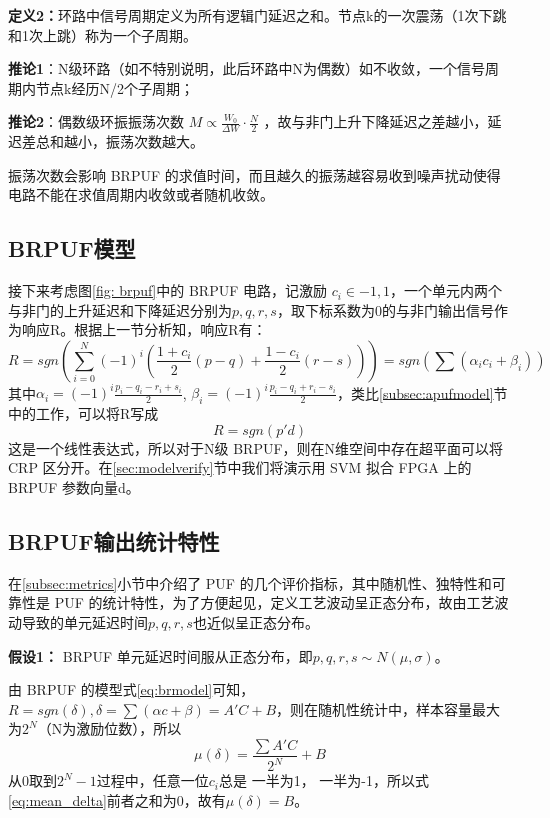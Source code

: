 \textbf{定义2：}环路中信号周期定义为所有逻辑门延迟之和。节点k的一次震荡（1次下跳和1次上跳）称为一个子周期。

\textbf{推论1}：N级环路（如不特别说明，此后环路中N为偶数）如不收敛，一个信号周期内节点k经历N/2个子周期；

\textbf{推论2}：偶数级环振振荡次数 $ M \propto \frac{W_0}{\Delta W}\cdot\frac{N}{2} $ ，故与非门上升下降延迟之差越小，延迟差总和越小，振荡次数越大。

振荡次数会影响 BRPUF 的求值时间，而且越久的振荡越容易收到噪声扰动使得电路不能在求值周期内收敛或者随机收敛。

\subsection{BRPUF模型}\label{subsec:brpufmodel}
接下来考虑图\ref{fig: brpuf}中的 BRPUF 电路，记激励 $ c_i\in{-1,1} $，一个单元内两个与非门的上升延迟和下降延迟分别为$ p,q,r,s $，取下标系数为0的与非门输出信号作为响应R。根据上一节分析知，响应R有：
\begin{equation}\label{eq:brmodel}
R=sgn(\sum\limits_{i=0}^{N}(-1)^i(\frac{1+c_i}{2}(p-q)+\frac{1-c_i}{2}(r-s)))=sgn(\sum(\alpha_i c_i+\beta_i))
\end{equation}
其中$ \alpha_i=(-1)^i\frac{p_i-q_i-r_i+s_i}{2} $, $ \beta_i=(-1)^i\frac{p_i-q_i+r_i-s_i}{2} $，类比\ref{subsec:apufmodel}节中的工作，可以将R写成
\begin{equation}
R=sgn(p'd)
\end{equation}
这是一个线性表达式，所以对于N级 BRPUF，则在N维空间中存在超平面可以将 CRP 区分开。在\ref{sec:modelverify}节中我们将演示用 SVM 拟合 FPGA 上的 BRPUF 参数向量d。

\subsection{BRPUF输出统计特性}\label{subsec:brpuf_stat}
在\ref{subsec:metrics}小节中介绍了 PUF 的几个评价指标，其中随机性、独特性和可靠性是 PUF 的统计特性，为了方便起见，定义工艺波动呈正态分布，故由工艺波动导致的单元延迟时间$ p,q,r,s $也近似呈正态分布。

\textbf{假设1：} BRPUF 单元延迟时间服从正态分布，即$ p,q,r,s \sim N(\mu,\sigma) $。

由 BRPUF 的模型式\ref{eq:brmodel}可知，$ R=sgn(\delta),\delta=\sum(\alpha c+\beta)=A'C+B $，则在随机性统计中，样本容量最大为$ 2^N $（N为激励位数），所以
\begin{equation}\label{eq:mean_delta}
\mu(\delta)=\frac{\sum A'C}{2^N}+B
\end{equation}
从0取到$ 2^N-1 $过程中，任意一位$ c_i $总是 一半为1， 一半为-1，所以式\ref{eq:mean_delta}前者之和为0，故有$ \mu(\delta)=B $。

